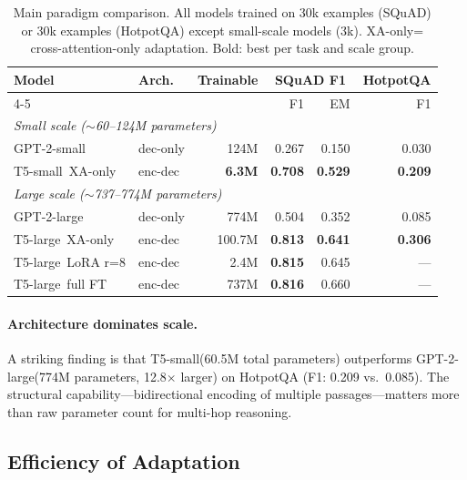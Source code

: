 \documentclass[11pt]{article}
\newcommand{\tssmall}{T5-small\xspace}
\newcommand{\tslarge}{T5-large\xspace}
\newcommand{\gptsmall}{GPT-2-small\xspace}
\newcommand{\gptlarge}{GPT-2-large\xspace}
\newcommand{\xaonly}{XA-only\xspace}
\newcommand{\squad}{SQuAD\xspace}
\newcommand{\hotpotqa}{HotpotQA\xspace}
\begin{document}
\begin{table}[t]
  \centering
  \small
  \caption{Main paradigm comparison. All models trained on 30k examples (SQuAD)
  or 30k examples (HotpotQA) except small-scale models (3k). \xaonly = cross-attention-only adaptation.
  Bold: best per task and scale group.}
  \label{tab:main-results}
  \begin{tabular}{llrrrr}
    \toprule
    \multirow{2}{*}{Model} & \multirow{2}{*}{Arch.} &
    \multirow{2}{*}{Trainable} &
    \multicolumn{2}{c}{\squad F1} & HotpotQA \\
    \cmidrule(lr){4-5}
    & & & F1 & EM & F1 \\
    \midrule
    \multicolumn{6}{l}{\emph{Small scale ($\sim$60--124M parameters)}} \\
    \gptsmall & dec-only & 124M & 0.267 & 0.150 & 0.030 \\
    \tssmall~\xaonly & enc-dec & \textbf{6.3M} & \textbf{0.708} & \textbf{0.529} & \textbf{0.209} \\
    \midrule
    \multicolumn{6}{l}{\emph{Large scale ($\sim$737--774M parameters)}} \\
    \gptlarge & dec-only & 774M & 0.504 & 0.352 & 0.085 \\
    \tslarge~\xaonly & enc-dec & 100.7M & \textbf{0.813} & \textbf{0.641} & \textbf{0.306} \\
    \tslarge~LoRA r=8 & enc-dec & 2.4M & \textbf{0.815} & 0.645 & — \\
    \tslarge~full FT & enc-dec & 737M & \textbf{0.816} & 0.660 & — \\
    \bottomrule
  \end{tabular}
\end{table}

\paragraph{Architecture dominates scale.}
A striking finding is that \tssmall (60.5M total parameters) outperforms
\gptlarge (774M parameters, 12.8$\times$ larger) on \hotpotqa
(F1: 0.209 vs.\ 0.085).
The structural capability---bidirectional encoding of multiple passages---matters
more than raw parameter count for multi-hop reasoning.

\subsection{Efficiency of Adaptation}
\label{sec:efficiency}
\end{document}
